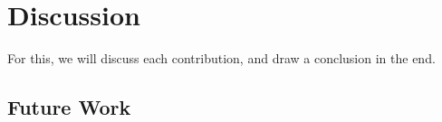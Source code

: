 \chapter{Discussion} \label{sec:discussion}

For this, we will discuss each contribution, and draw a conclusion in the end.

\section{\modelname{}}
\section{\programname{}}
\section{Future Work} \label{sec:future_work}


